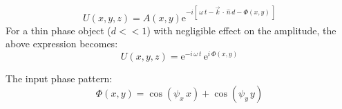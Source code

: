 \begin{equation}
U(x,y,z) = A(x,y)\mathrm{e}^{-i\left[\,\omega \, t - \vec{k} \,\cdot \,\hat{n} \, d - \Phi(x,y)\,\right]} 
\end{equation}
For a thin phase object ($d<<1$) with negligible effect on the amplitude, the above expression becomes:
\begin{equation}
U(x,y,z) =\mathrm{e}^{-i\,\omega \, t} \, \mathrm{e}^{i\,\Phi(x,y)} 
\end{equation}

The input phase pattern:
\begin{equation}
\Phi(x,y) = \cos(\psi_x \, x) + \cos(\psi_y \, y) 
\end{equation}




